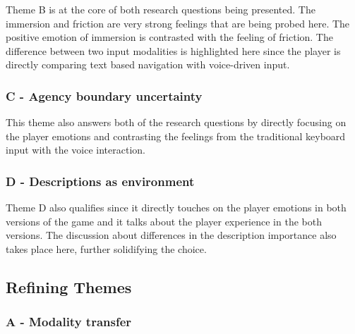 Theme B is at the core of both research questions being presented. The immersion and friction are very strong feelings that are being probed here.
The positive emotion of immersion is contrasted with the feeling of friction. The difference between two input modalities is highlighted here since the player is directly comparing text based navigation with voice-driven input.

\subsubsection{C - Agency boundary uncertainty}


This theme also answers both of the research questions by directly focusing on the player emotions and contrasting the feelings from the traditional keyboard input with the voice interaction.

\subsubsection{D - Descriptions as environment}


Theme D also qualifies since it directly touches on the player emotions in both versions of the game and it talks about the player experience in the both versions. The discussion about differences in the description importance also takes place here, further solidifying the choice.




\subsection{Refining Themes}

\subsubsection{A - Modality transfer}

